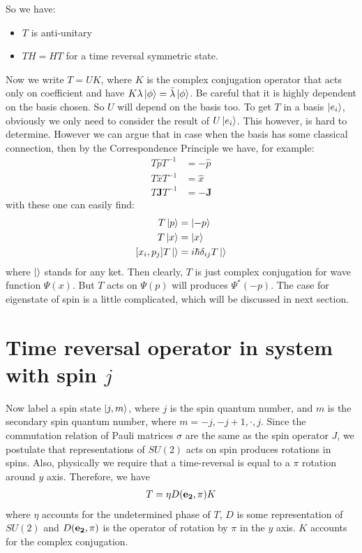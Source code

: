 \documentclass{article}
\begin{document}
So we have:
\begin{itemize}
    \item $T$ is anti-unitary
    \item $T H=HT$ for a time reversal symmetric state.
\end{itemize}

Now we write $T= UK$, where $K$ is the complex conjugation operator that
acts only on coefficient and have $K\lambda\ket{\phi} =
\bar{\lambda}\ket{\phi}$.
Be careful that it is highly dependent on the basis
chosen. So $U$ will depend on the basis too. To get $T$ in a
basis $\ket{e_i}$, obviously we only need to consider the result of
$U\ket{e_i}$. This however, is hard to determine. However we can argue
that in case when the basis has some classical connection, then by the
Correspondence Principle we have, for example:
\begin{align}
    T \hat{p} T^{-1}&= -\hat{p} \\
    T \hat{x} T^{-1}&= \hat{x} \\
    T \mathbf{J} T^{-1}&= -\mathbf{J}
\end{align}
with these one can easily find:
\begin{align}
    T \ket{p} &= \ket{-p} \\
    T \ket{x} &= \ket{x} \\
    [x_i, p_j]T \ket{} &= i\hbar \delta_{ij} T\ket{}
\end{align}
where $\ket{}$ stands for any ket. Then clearly, $T$ is just complex conjugation
for wave function $\Psi(x)$. But $T$ acts on $\Psi(p)$ will produces
$\Psi^*(-p)$. The case for eigenstate of spin is a little complicated, which
will be discussed in next section.

\section{Time reversal operator in system with spin 
\texorpdfstring{$j$}{}}
\label{sec:Time-reversal-operator-in-spin-j}

Now label a spin state $\ket{j,m}$, where $j$ is the spin quantum number, and
$m$ is the secondary spin quantum number, where $m=-j,-j+1,\cdot,j$.
Since the commutation relation of Pauli matrices $\sigma$ are the same as the
spin operator $J$, we postulate that representations of $SU(2)$ acts on spin produces
rotations in spins. Also, physically we require that a time-reversal is equal to
a $\pi$ rotation around $y$ axis. Therefore, we have
\begin{align}
    T = \eta D(\vb{e_2},\pi)K
\end{align}
where $\eta$ accounts for the undetermined phase of $T$, $D$ is some
representation of $SU(2)$ and $D(\vb{e_2},\pi)$ is the operator of rotation by $\pi$ in
the $y$ axis. $K$ accounts for the complex conjugation.
\end{document}
